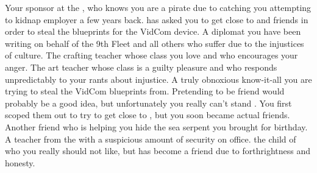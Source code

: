 \documentclass[char]{GL2020}
\begin{document}
\begin{contacts}
    \contact{\cChupLeader{}} Your sponsor at the \pSc{}, who knows you are a pirate due to catching you attempting to kidnap \cChupLeader{\their} employer a few years back. \cChupLeader{} has asked you to get close to \cTechStar{} and \cTechStar{\their} friends in order to steal the blueprints for the VidCom device.
    \contact{\cJuniorStatesman{}} A diplomat you have been writing on behalf of the 9th Fleet and all others who suffer due to the injustices of \pShippie{} culture.
    \contact{\cPirate{}} The crafting teacher whose class you love and who encourages your anger.
    \contact{\cChupAvenger{}} The art teacher whose class is a guilty pleasure and who responds unpredictably to your rants about injustice.
    \contact{\cTechStar{}} A truly obnoxious know-it-all you are trying to steal the VidCom blueprints from. Pretending to be \cTechStar{\their} friend would probably be a good idea, but unfortunately you really can’t stand \cTechStar{\them}.
    \contact{\cDisney{}} You first scoped them out to try to get close to \cTechStar{}, but you soon became actual friends.
    \contact{\cAdopted{}} Another friend who is helping you hide the sea serpent you brought \cDisney{} for \cDisney{\their} birthday.
    \contact{\cChupInventor{}} A teacher from the \pTech{} with a suspicious amount of security on \cChupInventor{\their} office.
    \contact{\cWarlordDaughter{}} the child of \cLoud{} who you really should not like, but has become a friend due to \cWarlordDaughter{\their} forthrightness and honesty.
\end{contacts}
\end{document}
